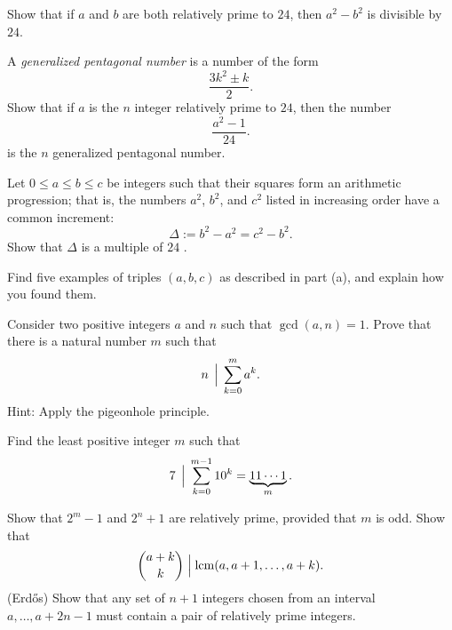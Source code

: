\begin{challenge}
  \exercise \label{exercise:div-increment-a-p-squares}
  \begin{subexenum}
  \item Show that if $a$ and $b$ are both relatively prime to $24$, then $a^2-b^2$ is divisible by $24$.
  \item A \emph{generalized pentagonal number} is a number of the form
    \begin{equation*}
      \frac{3k^2\pm k}{2}.
    \end{equation*}
    Show that if $a$ is the $n$\supth{} integer relatively prime to $24$, then the number
    \begin{equation*}
      \frac{a^2-1}{24}.
    \end{equation*}
    is the $n$\supth{} generalized pentagonal number.
  \item Let $0\leq a\leq b\leq c$ be integers such that their squares form an arithmetic progression; that is, the numbers $a^2$, $b^2$, and $c^2$ listed in increasing order have a common increment:
  \begin{equation*}
    \Delta:=b^2-a^2=c^2-b^2.
  \end{equation*}
  Show that $\Delta$ is a multiple of $24$ \cite{fibonacci1987}.
  \item Find five examples of triples $(a,b,c)$ as described in part (a), and explain how you found them.
  \end{subexenum}
  \exercise
  \begin{subexenum}
  \item Consider two positive integers $a$ and $n$ such that $\gcd(a,n)=1$. Prove that there is a natural number $m$ such that
    \begin{equation*}
      n\,\Bigm|\, \sum_{k=0}^m a^k.
    \end{equation*}
    Hint: Apply the pigeonhole principle.
  \item Find the least positive integer $m$ such that
    \begin{equation*}
      7\,\Bigm|\, \sum_{k=0}^{m-1} 10^k = \underbrace{11\cdots1}_{m}.
    \end{equation*}
  \end{subexenum}
  \exercise Show that $2^m-1$ and $2^n+1$ are relatively prime, provided that $m$ is odd.
  \exercise Show that
  \begin{equation*}
    \binom{a+k}{k}\Bigm| \operatorname*{lcm}(a,a+1,\ldots,a+k).
  \end{equation*}
  \exercise (Erd\H{o}s) Show that any set of $n+1$ integers chosen from an interval $a,\ldots,a+2n-1$ must contain a pair of relatively prime integers.

\end{challenge}
